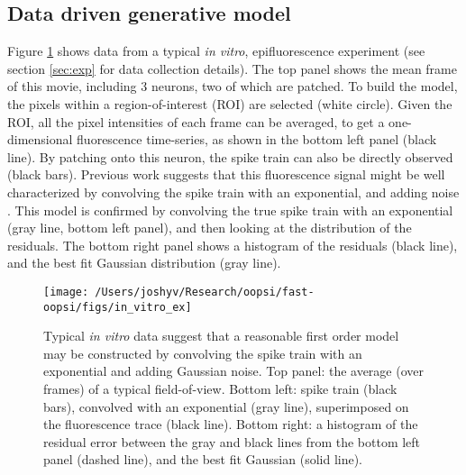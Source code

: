 \subsection{Data driven generative model} \label{sec:model}

Figure \ref{fig:in_vitro_ex} shows data from a typical \emph{in vitro}, epifluorescence experiment (see section \ref{sec:exp} for data collection details).  The top panel shows the mean frame of this movie, including 3 neurons, two of which are patched.  To build the model, the pixels within a region-of-interest (ROI) are selected (white circle).  Given the ROI, all the pixel intensities of each frame can be averaged, to get a one-dimensional fluorescence time-series, as shown in the bottom left panel (black line).  By patching onto this neuron, the spike train can also be directly observed (black bars). Previous work suggests that this fluorescence signal might be well characterized by convolving the spike train with an exponential, and adding noise \cite{ImagingManual}.  This model is confirmed by convolving the true spike train with an exponential (gray line, bottom left panel), and then looking at the distribution of the residuals.  The bottom right panel shows a histogram of the residuals (black line), and the best fit Gaussian distribution (gray line).


\begin{figure}[h!]
\centering \texttt{[image: /Users/joshyv/Research/oopsi/fast-oopsi/figs/in\_vitro\_ex]}
\caption[data-based model]{Typical \emph{in vitro} data suggest that a reasonable first order model may be constructed by convolving the spike train with an exponential and adding Gaussian noise. Top panel: the average (over frames) of a typical field-of-view.  Bottom left: spike train (black bars), convolved with an exponential (gray line), superimposed on the fluorescence trace (black line).  Bottom right: a histogram of the residual error between the gray and black lines from the bottom left panel (dashed line), and the best fit Gaussian (solid line).} \label{fig:in_vitro_ex}
\end{figure}

